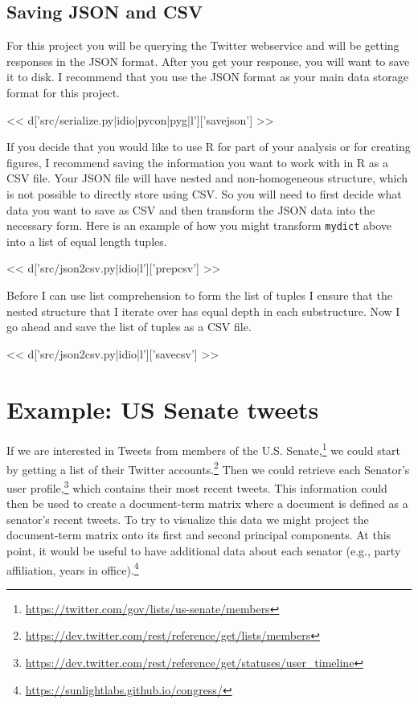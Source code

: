 \subsection*{Saving JSON and CSV}
For this project you will be querying the Twitter webservice and will
be getting responses in the JSON format.  After you get your response,
you will want to save it to disk.  I recommend that you use the JSON
format as your main data storage format for this project.

<< d['src/serialize.py|idio|pycon|pyg|l']['savejson'] >>

If you decide that you would like to use R for part of your analysis or for
creating figures, I recommend saving the information you want to work with in R
as a CSV file.  Your JSON file will have nested and non-homogeneous structure,
which is not possible to directly store using CSV.  So you will need to first
decide what data you want to save as CSV and then transform the JSON data into
the necessary form.  Here is an example of how you might transform
\texttt{mydict} above into a list of equal length tuples.

<< d['src/json2csv.py|idio|l']['prepcsv'] >>

Before I can use list comprehension to form the list of tuples I ensure that
the nested structure that I iterate over has equal depth in each substructure.
Now I go ahead and save the list of tuples as a CSV file.

<< d['src/json2csv.py|idio|l']['savecsv'] >>


\section{Example: US Senate tweets}

If we are interested in Tweets from members of the U.S.
Senate,\footnote{\url{https://twitter.com/gov/lists/us-senate/members}}
we could start by getting a list of their Twitter
accounts.\footnote{\url{https://dev.twitter.com/rest/reference/get/lists/members}}
Then we could retrieve each Senator's user profile,\footnote{\url{https://dev.twitter.com/rest/reference/get/statuses/user_timeline}}
which contains their most recent tweets.  This information could then be used
to create a document-term matrix where a document is defined as a senator's
recent tweets.  To try to visualize this data we might project the document-term matrix
onto its first and second principal components.  At this point, it would be
useful to have additional data about each senator (e.g., party affiliation,
years in office).\footnote{\url{https://sunlightlabs.github.io/congress/}}

